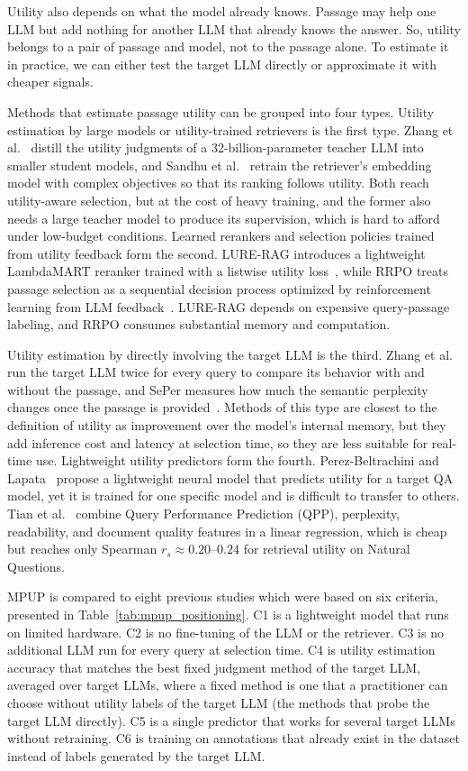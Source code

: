\documentclass[conference]{IEEEtran}
\begin{document}
Utility also depends on what the model already knows. Passage may help one LLM but add nothing for another LLM that already knows the answer. So, utility belongs to a pair of passage and model, not to the passage alone. To estimate it in practice, we can either test the target LLM directly or approximate it with cheaper signals.

Methods that estimate passage utility can be grouped into four types. Utility estimation by large models or utility-trained retrievers is the first type. Zhang et al.~\cite{zhang2025b} distill the utility judgments of a 32-billion-parameter teacher LLM into smaller student models, and Sandhu et al.~\cite{sandhu2026} retrain the retriever’s embedding model with complex objectives so that its ranking follows utility. Both reach utility-aware selection, but at the cost of heavy training, and the former also needs a large teacher model to produce its supervision, which is hard to afford under low-budget conditions. Learned rerankers and selection policies trained from utility feedback form the second. LURE-RAG introduces a lightweight LambdaMART reranker trained with a listwise utility loss~\cite{chandra2026}, while RRPO treats passage selection as a sequential decision process optimized by reinforcement learning from LLM feedback~\cite{wu2026}. LURE-RAG depends on expensive query-passage labeling, and RRPO consumes substantial memory and computation.

Utility estimation by directly involving the target LLM is the third. Zhang et al.~\cite{zhang2025c} run the target LLM twice for every query to compare its behavior with and without the passage, and SePer measures how much the semantic perplexity changes once the passage is provided~\cite{dai2025}. Methods of this type are closest to the definition of utility as improvement over the model’s internal memory, but they add inference cost and latency at selection time, so they are less suitable for real-time use. Lightweight utility predictors form the fourth. Perez-Beltrachini and Lapata~\cite{perez2025} propose a lightweight neural model that predicts utility for a target QA model, yet it is trained for one specific model and is difficult to transfer to others. Tian et al.~\cite{tian2026} combine Query Performance Prediction (QPP), perplexity, readability, and document quality features in a linear regression, which is cheap but reaches only Spearman $r_s \approx 0.20$--$0.24$ for retrieval utility on Natural Questions.

MPUP is compared to eight previous studies which were based on six criteria, presented in Table~\ref{tab:mpup_positioning}. C1 is a lightweight model that runs on limited hardware. C2 is no fine-tuning of the LLM or the retriever. C3 is no additional LLM run for every query at selection time. C4 is utility estimation accuracy that matches the best fixed judgment method of the target LLM, averaged over target LLMs, where a fixed method is one that a practitioner can choose without utility labels of the target LLM (the methods that probe the target LLM directly). C5 is a single predictor that works for several target LLMs without retraining. C6 is training on annotations that already exist in the dataset instead of labels generated by the target LLM.
\end{document}
